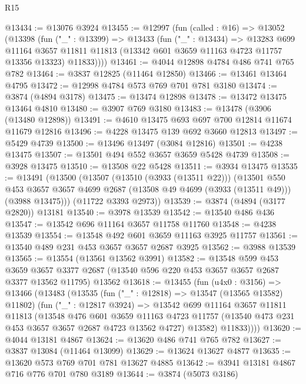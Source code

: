 \begin{lexlean}{R15}
\begin{coremodule}
@13434 := @13076 @3924
@13455 := @12997
    (fun (called : @16) =>
    @13052
      (@13398
        (fun ("_" : @13399) =>
        @13433
          (fun ("_" : @13434) =>
          @13283
            @699
            @11164
            @3657
            @11811
            @11813
            (@13342 @601 @3659 @11163 @4723 @11757 @13356 @13323)
            @11833))))
@13461 := @4044 @12898 @4784 @486 @741 @765 @782
@13464 := @3837 @12825 (@11464 @12850)
@13466 := @13461 @13464 @4795
@13472 := @12998 @4784 @573 @769 @701 @781 @3180
@13474 := @3874 (@4894 @3178)
@13475 := @13474 @12898
@13478 := @13472 @13475 @13464 @4810
@13480 := @3907 @769 @3180
@13483 := @13478 (@3906 (@13480 @12898))
@13491 := @4610 @13475 @693 @697 @700 @12814 @11674 @11679 @12816
@13496 := @4228 @13475 @139 @692 @3660 @12813
@13497 := @5429 @4739
@13500 := @13496 @13497 (@3084 @12816)
@13501 := @4238 @13475
@13507 := @13501 @494 @552 @3657 @3659 @5428 @4739
@13508 := @3928 @13475
@13510 := @13508 @22 @5428
@13511 := @3934 @13475
@13535 := @13491
    (@13500
      (@13507
        (@13510 (@3933 (@13511 @22)))
        (@13501
          @550
          @453
          @3657
          @3657
          @4699
          @2687
          (@13508 @49 @4699 (@3933 (@13511 @49)))
          (@3988 @13475)))
      (@11722 @3393 @2973))
@13539 := @3874 (@4894 (@3177 @2820)) @13181
@13540 := @3978 @13539
@13542 := @13540 @486 @436
@13547 := @13542 @696 @11164 @3657 @11758 @11760
@13548 := @4238 @13539
@13554 := @13548 @492 @601 @3659 @11163 @3925 @11757
@13561 := @13540 @489 @231 @453 @3657 @3657 @2687 @3925
@13562 := @3988 @13539
@13565 := @13554 (@13561 @13562 @3991)
@13582 := @13548
    @599
    @453
    @3659
    @3657
    @3377
    @2687
    (@13540 @596 @220 @453 @3657 @3657 @2687 @3377 @13562 @11795)
    @13562
@13618 := @13455
    (fun (u4x0 : @3156) =>
    @13466
      (@13483
        (@13535
          (fun ("_" : @12818) => @13547 (@13565 @13582) @11802)
          (fun ("_" : @12817 @3924) =>
          @13542
            @699
            @11164
            @3657
            @11811
            @11813
            (@13548
              @476
              @601
              @3659
              @11163
              @4723
              @11757
              (@13540 @473 @231 @453 @3657 @3657 @2687 @4723 @13562 @4727)
              @13582)
            @11833))))
@13620 := @4044 @13181 @4867
@13624 := @13620 @486 @741 @765 @782
@13627 := @3837 @13084 (@11464 @13099)
@13629 := @13624 @13627 @4877
@13635 := @13620 @573 @769 @701 @781 @13627 @4885
@13642 := @3941 @13181 @4867 @716 @776 @701 @780 @3189
@13644 := @3874 (@5073 @3186)

\end{coremodule}
\end{lexlean}
